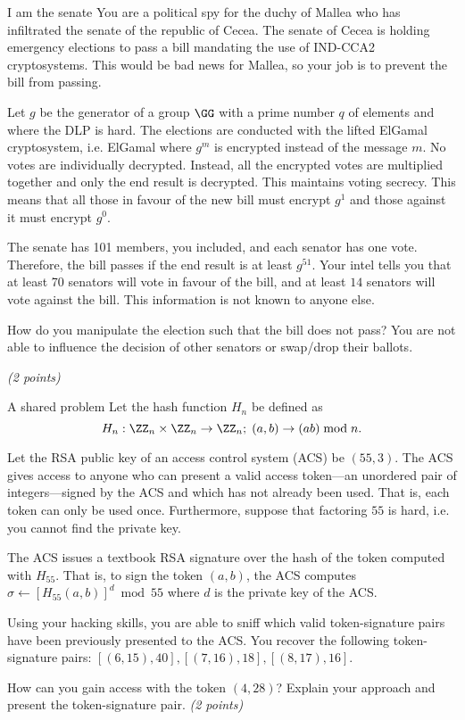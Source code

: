 \documentclass{homework}
\begin{document}
\begin{task}{I am the senate}
  You are a political spy for the duchy of Mallea who has infiltrated the senate of the republic of Cecea.
  The senate of Cecea is holding emergency elections to pass a bill mandating the use of IND-CCA2 cryptosystems.
  This would be bad news for Mallea, so your job is to prevent the bill from passing.

  Let $g$ be the generator of a group $\GG$ with a prime number $q$ of elements and where the DLP is hard.
  The elections are conducted with the lifted ElGamal cryptosystem, i.e. ElGamal where $g^m$ is encrypted instead of the message $m$.
  No votes are individually decrypted.
  Instead, all the encrypted votes are multiplied together and only the end result is decrypted.
  This maintains voting secrecy.
  This means that all those in favour of the new bill must encrypt $g^1$ and those against it must encrypt $g^0$.

  The senate has 101 members, you included, and each senator has one vote.
  Therefore, the bill passes if the end result is at least $g^{51}$.
  Your intel tells you that at least 70 senators will vote in favour of the bill, and at least $14$ senators will vote against the bill.
  This information is not known to anyone else.

  How do you manipulate the election such that the bill does not pass?
  You are not able to influence the decision of other senators or swap/drop their ballots.
  
  \textit{(2 points)}
\end{task}

\newpage

\begin{task}{A shared problem}
  Let the hash function $H_n$ be defined as
  \[
    H_n: \ZZ_n \times \ZZ_n \to \ZZ_n;\; (a, b) \to (ab) \bmod{n}.
  \]

  Let the RSA public key of an access control system (ACS) be $(55, 3)$.
  The ACS gives access to anyone who can present a valid access token---an unordered pair of integers---signed by the ACS and which has not already been used.
  That is, each token can only be used once.
  Furthermore, suppose that factoring $55$ is hard, i.e. you cannot find the private key.

  The ACS issues a textbook RSA signature over the hash of the token computed with $H_{55}$.
  That is, to sign the token $(a, b)$, the ACS computes $\sigma \gets [H_{55}(a,b)]^d \bmod{55}$ where $d$ is the private key of the ACS.

  Using your hacking skills, you are able to sniff which valid token-signature pairs have been previously presented to the ACS.
  You recover the following token-signature pairs:
  $[(6, 15), 40], [(7, 16), 18], [(8, 17), 16]$.

  How can you gain access with the token $(4, 28)$?
  Explain your approach and present the token-signature pair.
  \textit{(2 points)}
\end{task}
\end{document}
